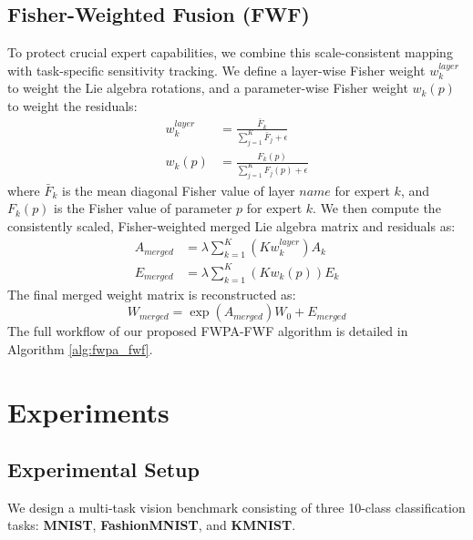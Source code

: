 \documentclass{article}
\theoremstyle{plain}
\theoremstyle{definition}
\theoremstyle{remark}
\begin{document}
\subsection{Fisher-Weighted Fusion (FWF)}
To protect crucial expert capabilities, we combine this scale-consistent mapping with task-specific sensitivity tracking. We define a layer-wise Fisher weight $w^{layer}_k$ to weight the Lie algebra rotations, and a parameter-wise Fisher weight $w_k(p)$ to weight the residuals:
\begin{align}
    w^{layer}_k &= \frac{\bar{F}_k}{\sum_{j=1}^K \bar{F}_j + \epsilon} \\
    w_k(p) &= \frac{F_k(p)}{\sum_{j=1}^K F_j(p) + \epsilon}
\end{align}
where $\bar{F}_k$ is the mean diagonal Fisher value of layer $name$ for expert $k$, and $F_k(p)$ is the Fisher value of parameter $p$ for expert $k$. We then compute the consistently scaled, Fisher-weighted merged Lie algebra matrix and residuals as:
\begin{align}
    A_{merged} &= \lambda \sum_{k=1}^K \left( K w^{layer}_k \right) A_k \\
    E_{merged} &= \lambda \sum_{k=1}^K \left( K w_k(p) \right) E_k
\end{align}
The final merged weight matrix is reconstructed as:
\begin{equation}
    W_{merged} = \exp(A_{merged}) W_0 + E_{merged}
\end{equation}
The full workflow of our proposed FWPA-FWF algorithm is detailed in Algorithm \ref{alg:fwpa_fwf}.

\section{Experiments}
\label{sec:experiments}

\subsection{Experimental Setup}
We design a multi-task vision benchmark consisting of three 10-class classification tasks: \textbf{MNIST}, \textbf{FashionMNIST}, and \textbf{KMNIST}. 
\end{document}
